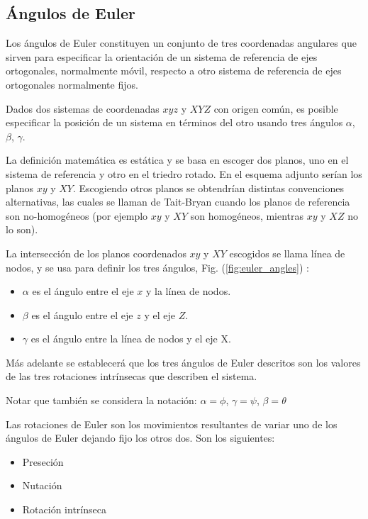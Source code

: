 \subsection{Ángulos de Euler}


Los ángulos de Euler constituyen un conjunto de tres coordenadas angulares que
sirven para especificar la orientación de un sistema de referencia de ejes
ortogonales, normalmente móvil, respecto a otro sistema de referencia de ejes
ortogonales normalmente fijos.

Dados dos sistemas de coordenadas $xyz$ y $XYZ$ con origen común, es posible
especificar la posición de un sistema en términos del otro usando tres ángulos
$\alpha$, $\beta$, $\gamma$.

La definición matemática es estática y se basa en escoger dos planos, uno en el
sistema de referencia y otro en el triedro rotado. En el esquema adjunto serían
los planos $xy$ y $XY$. Escogiendo otros planos se obtendrían distintas convenciones
alternativas, las cuales se llaman de Tait-Bryan cuando los planos de referencia
son no-homogéneos (por ejemplo $xy$ y $XY$ son homogéneos, mientras $xy$ y $XZ$ no lo
son).

La intersección de los planos coordenados $xy$ y $XY$ escogidos se llama línea de
nodos, y se usa para definir los tres ángulos, Fig. (\ref{fig:euler_angles}) :

\begin{itemize}
    \item $\alpha$ es el ángulo entre el eje $x$ y la línea de nodos.
    \item $\beta$  es el ángulo entre el eje $z$ y el eje $Z$.
    \item $\gamma$  es el ángulo entre la línea de nodos y el eje X.
\end{itemize}

Más adelante se establecerá que los tres ángulos de Euler descritos son los
valores de las tres rotaciones intrínsecas que describen el sistema.

Notar que también se considera la notación: $\alpha =\phi$, $\gamma =\psi$,
$\beta =\theta$

Las rotaciones de Euler son los movimientos resultantes de variar uno de los
ángulos de Euler dejando fijo los otros dos. Son los siguientes:

\begin{itemize}
    \item Preseción
    \item Nutación
    \item Rotación intrínseca
\end{itemize}

